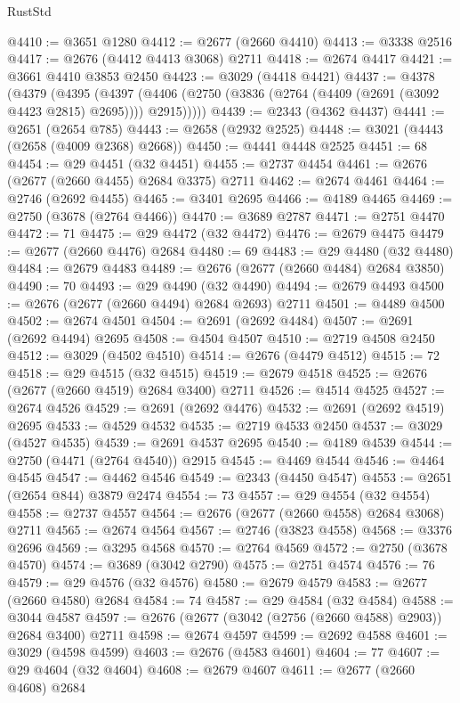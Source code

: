 \begin{lexlean}{RustStd}
\begin{coremodule}
{\begin{coremodule}
{{{{{{{{{{{{{{{{{{{{{{{{{{{{{{{{{{{{{{{{{{{{{{{{{{{{{{{@4410 := @3651 @1280
@4412 := @2677 (@2660 @4410)
@4413 := @3338 @2516
@4417 := @2676 (@4412 @4413 @3068) @2711
@4418 := @2674 @4417
@4421 := @3661 @4410 @3853 @2450
@4423 := @3029 (@4418 @4421)
@4437 := @4378
    (@4379
      (@4395
        (@4397 (@4406 (@2750 (@3836 (@2764 (@4409 (@2691 (@3092 @4423 @2815) @2695)))) @2915)))))
@4439 := @2343 (@4362 @4437)
@4441 := @2651 (@2654 @785)
@4443 := @2658 (@2932 @2525)
@4448 := @3021 (@4443 (@2658 (@4009 @2368) @2668))
@4450 := @4441 @4448 @2525
@4451 := 68
@4454 := @29 @4451 (@32 @4451)
@4455 := @2737 @4454
@4461 := @2676 (@2677 (@2660 @4455) @2684 @3375) @2711
@4462 := @2674 @4461
@4464 := @2746 (@2692 @4455)
@4465 := @3401 @2695
@4466 := @4189 @4465
@4469 := @2750 (@3678 (@2764 @4466))
@4470 := @3689 @2787
@4471 := @2751 @4470
@4472 := 71
@4475 := @29 @4472 (@32 @4472)
@4476 := @2679 @4475
@4479 := @2677 (@2660 @4476) @2684
@4480 := 69
@4483 := @29 @4480 (@32 @4480)
@4484 := @2679 @4483
@4489 := @2676 (@2677 (@2660 @4484) @2684 @3850)
@4490 := 70
@4493 := @29 @4490 (@32 @4490)
@4494 := @2679 @4493
@4500 := @2676 (@2677 (@2660 @4494) @2684 @2693) @2711
@4501 := @4489 @4500
@4502 := @2674 @4501
@4504 := @2691 (@2692 @4484)
@4507 := @2691 (@2692 @4494) @2695
@4508 := @4504 @4507
@4510 := @2719 @4508 @2450
@4512 := @3029 (@4502 @4510)
@4514 := @2676 (@4479 @4512)
@4515 := 72
@4518 := @29 @4515 (@32 @4515)
@4519 := @2679 @4518
@4525 := @2676 (@2677 (@2660 @4519) @2684 @3400) @2711
@4526 := @4514 @4525
@4527 := @2674 @4526
@4529 := @2691 (@2692 @4476)
@4532 := @2691 (@2692 @4519) @2695
@4533 := @4529 @4532
@4535 := @2719 @4533 @2450
@4537 := @3029 (@4527 @4535)
@4539 := @2691 @4537 @2695
@4540 := @4189 @4539
@4544 := @2750 (@4471 (@2764 @4540)) @2915
@4545 := @4469 @4544
@4546 := @4464 @4545
@4547 := @4462 @4546
@4549 := @2343 (@4450 @4547)
@4553 := @2651 (@2654 @844) @3879 @2474
@4554 := 73
@4557 := @29 @4554 (@32 @4554)
@4558 := @2737 @4557
@4564 := @2676 (@2677 (@2660 @4558) @2684 @3068) @2711
@4565 := @2674 @4564
@4567 := @2746 (@3823 @4558)
@4568 := @3376 @2696
@4569 := @3295 @4568
@4570 := @2764 @4569
@4572 := @2750 (@3678 @4570)
@4574 := @3689 (@3042 @2790)
@4575 := @2751 @4574
@4576 := 76
@4579 := @29 @4576 (@32 @4576)
@4580 := @2679 @4579
@4583 := @2677 (@2660 @4580) @2684
@4584 := 74
@4587 := @29 @4584 (@32 @4584)
@4588 := @3044 @4587
@4597 := @2676 (@2677 (@3042 (@2756 (@2660 @4588) @2903)) @2684 @3400) @2711
@4598 := @2674 @4597
@4599 := @2692 @4588
@4601 := @3029 (@4598 @4599)
@4603 := @2676 (@4583 @4601)
@4604 := 77
@4607 := @29 @4604 (@32 @4604)
@4608 := @2679 @4607
@4611 := @2677 (@2660 @4608) @2684
}}}}}}}}}}}}}}}}}}}}}}}}}}}}}}}}}}}}}}}}}}}}}}}}}}}}}}}
\end{coremodule}}
\end{coremodule}
\end{lexlean}
